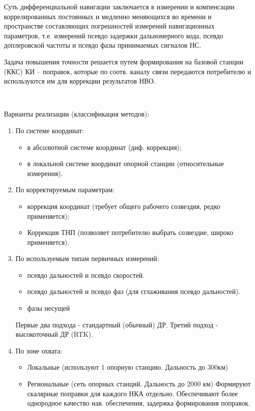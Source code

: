 \documentclass[14pt,a4paper,oneside]{extarticle}
\begin{document}
Суть дифференциальной навигации заключается в измерении и компенсации коррелированных постоянных и медленно меняющихся во времени и пространстве составляющих погрешностей измерений навигационных параметров, т.е. измерений псевдо задержки дальномерного кода, псевдо доплеровской частоты и псевдо фазы принимаемых сигналов НС.

Задача повышения точности решается путем формирования на базовой станции (ККС) КИ – поправок, которые по соотв. каналу связи передаются потребителю и используются им для коррекции результатов НВО.

\

Варианты реализации (классификация методов):

\begin{enumerate}
    \item По системе координат:
          \begin{itemize}
              \item в абсолютной системе координат (диф. коррекция);
              \item в локальной системе координат опорной станции (относительные измерения).
          \end{itemize}
    \item По корректируемым параметрам:
          \begin{itemize}
              \item коррекция координат (требует общего рабочего созвездия, редко применяется);
              \item Коррекция ТНП (позволяет потребителю выбрать созвездие, широко применяется).
          \end{itemize}
    \item По используемым типам первичных измерений:
          \begin{itemize}
              \item псевдо дальностей и псевдо скоростей.
              \item псевдо дальностей и псевдо фаз (для сглаживания псевдо дальностей).
              \item фазы несущей
          \end{itemize}
          Первые два подхода - стандартный (обычный) ДР.
          Третий подход - высокоточный ДР (RTK).
    \item По зоне охвата:
          \begin{itemize}
              \item Локальные (используют 1 опорную станцию. Дальность до 300км)
              \item Региональные (сеть опорных станций. Дальность до 2000 км) Формируют скалярные поправки для каждого НКА отдельно. Обеспечивают более однородное качество нав. обеспечения, задержка формирования поправок.

\end{itemize}
\end{enumerate}
\end{document}
